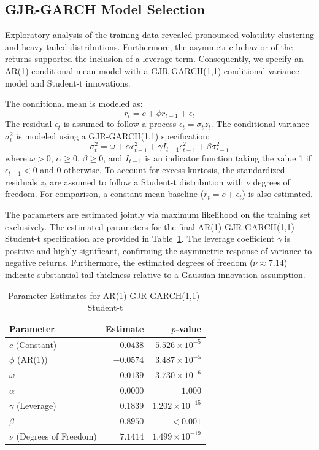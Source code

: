 \documentclass[11pt,a4paper]{article}
\begin{document}
\subsection{GJR-GARCH Model Selection}
Exploratory analysis of the training data revealed pronounced volatility clustering and heavy-tailed distributions. Furthermore, the asymmetric behavior of the returns supported the inclusion of a leverage term. Consequently, we specify an AR(1) conditional mean model with a GJR-GARCH(1,1) conditional variance model and Student-t innovations. 

The conditional mean is modeled as:
\begin{equation}
r_t = c + \phi r_{t-1} + \epsilon_t
\end{equation}
The residual $\epsilon_t$ is assumed to follow a process $\epsilon_t = \sigma_t z_t$. The conditional variance $\sigma_t^2$ is modeled using a GJR-GARCH(1,1) specification:
\begin{equation}
\sigma_t^2 = \omega + \alpha \epsilon_{t-1}^2 + \gamma I_{t-1} \epsilon_{t-1}^2 + \beta \sigma_{t-1}^2
\end{equation}
where $\omega > 0$, $\alpha \ge 0$, $\beta \ge 0$, and $I_{t-1}$ is an indicator function taking the value 1 if $\epsilon_{t-1} < 0$ and 0 otherwise. To account for excess kurtosis, the standardized residuals $z_t$ are assumed to follow a Student-t distribution with $\nu$ degrees of freedom. For comparison, a constant-mean baseline ($r_t = c + \epsilon_t$) is also estimated.

The parameters are estimated jointly via maximum likelihood on the training set exclusively. The estimated parameters for the final AR(1)-GJR-GARCH(1,1)-Student-t specification are provided in Table~\ref{tab:garch_params}. The leverage coefficient $\gamma$ is positive and highly significant, confirming the asymmetric response of variance to negative returns. Furthermore, the estimated degrees of freedom ($\nu \approx 7.14$) indicate substantial tail thickness relative to a Gaussian innovation assumption.

\begin{table}[H]
\centering
\caption{Parameter Estimates for AR(1)-GJR-GARCH(1,1)-Student-t}
\label{tab:garch_params}
\begin{tabular}{lrr}
\toprule
Parameter & Estimate & $p$-value \\
\midrule
$c$ (Constant) & $0.0438$ & $5.526 \times 10^{-5}$ \\
$\phi$ (AR(1)) & $-0.0574$ & $3.487 \times 10^{-5}$ \\
$\omega$ & $0.0139$ & $3.730 \times 10^{-6}$ \\
$\alpha$ & $0.0000$ & $1.000$ \\
$\gamma$ (Leverage) & $0.1839$ & $1.202 \times 10^{-15}$ \\
$\beta$ & $0.8950$ & $< 0.001$ \\
$\nu$ (Degrees of Freedom) & $7.1414$ & $1.499 \times 10^{-19}$ \\
\bottomrule
\end{tabular}
\end{table}
\end{document}
